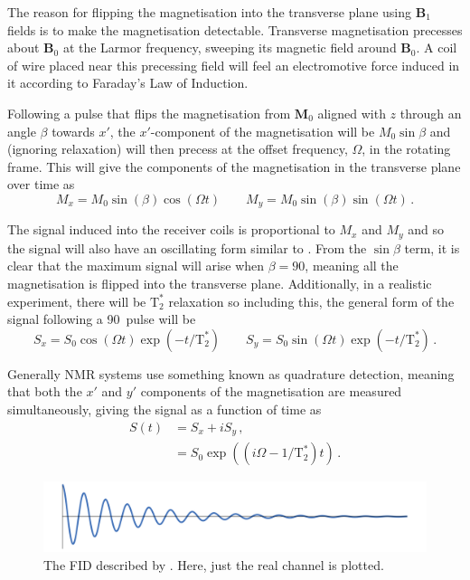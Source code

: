 The reason for flipping the magnetisation into the transverse plane using $\mathbf{B}_1$ fields is to make the magnetisation detectable. 
Transverse magnetisation precesses about $\mathbf{B}_0$ at the Larmor frequency, sweeping its magnetic field around $\mathbf{B}_0$. 
A coil of wire placed near this precessing field will feel an electromotive force induced in it according to Faraday's Law of Induction\cite{Haacke1999}.

Following a pulse that flips the magnetisation from $\mathbf{M}_0$ aligned with $z$ through an angle $\beta$ towards $x'$, the $x'$-component of the magnetisation will be $M_0\sin\beta$ and (ignoring relaxation) will then precess at the offset frequency, $\Omega$, in the rotating frame. This will give the components of the magnetisation in the transverse plane over time as 
\begin{equation}
M_x = M_0\sin(\beta)\cos(\Omega t) \qquad M_y = M_0\sin(\beta)\sin(\Omega t)\,.\label{eq:MxMy}
\end{equation}

The signal induced into the receiver coils is proportional to $M_x$ and $M_y$ and so the signal will also have an oscillating form similar to .
From the $\sin\beta$ term, it is clear that the maximum signal will arise when $\beta = 90$\degree, meaning all the magnetisation is flipped into the transverse plane. 
Additionally, in a realistic experiment, there will be $\mathrm{T_2^*}$ relaxation so including this, the general form of the signal following a 90\degree\ pulse will be\cite{DeGraaf2007} 
\begin{equation}
S_x = S_0\cos(\Omega t)\exp\left(-t/\mathrm{T}_2^*\right) \qquad S_y = S_0\sin(\Omega t)\exp\left(-t/\mathrm{T}_2^*\right)\,.
\end{equation}

Generally \ac{NMR} systems use something known as quadrature detection, meaning that both the $x'$ and $y'$ components of the magnetisation are measured simultaneously\cite{Levitt2008}, giving the signal as a function of time as 
\begin{align}
	S(t) &= S_x + iS_y\,,\nonumber\\
		 &= S_0\exp((i\Omega - 1/\mathrm{T}_2^*)t)\,.\label{eq:fid}
\end{align}  

\begin{figure}
  \centering
  \includegraphics[width=\textwidth]{figures/background/FID_copy.png}
  \caption{The \acl{FID} described by . Here, just the real channel is plotted.}
  \label{fig:fid}
\end{figure}

